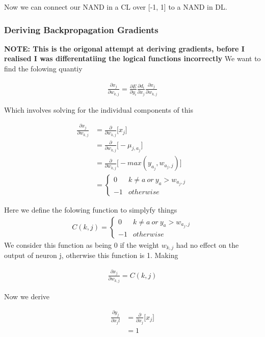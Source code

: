 \documentclass{article}
\begin{document}
Now we can connect our NAND in a CL over [-1, 1] to a NAND in DL. 

\subsubsection{Deriving Backpropagation Gradients}
\textbf{NOTE: This is the origonal attempt at deriving gradients, before I realised I was differentatiing the logical functions incorrectly}
We want to find the folowing quantiy

\begin{align}
\frac{\partial x_j}{\partial w_{k,j}} = \frac{\partial E}{\partial y_i} \frac{\partial d_i}{\partial x_j} \frac{\partial x_j}{\partial w_{k,j}}
\end{align}

Which involves solving for the individual components of this

\begin{align*}
\frac{\partial x_j}{\partial w_{k,j}} &= \frac{\partial}{\partial w_{k,j}} \bigg[ x_j \bigg] \\
&= \frac{\partial}{\partial w_{k,j}} \bigg[ -\mu_{j, a_j} \bigg] \\
&= \frac{\partial}{\partial w_{k,j}} \bigg[ -max(y_{a_j}, w_{a_j, j}) \bigg] \\
&= 
\begin{cases}
0 & k \neq a\ or\ y_a > w_{a_j, j} \\
-1 & otherwise
\end{cases} 
\end{align*}

Here we define the folowing function to simplyfy things
\begin{align*}
C(k, j) =  
\begin{cases}
0 & k \neq a\ or\ y_a > w_{a_j, j} \\
-1 & otherwise
\end{cases} 
\end{align*}
We consider this function as being 0 if the weight $w_{k, j}$ had no effect on the output of neuron j, otherwise this function is 1. Making 

\begin{align}
\frac{\partial x_j}{\partial w_{k, j}} = C(k, j)
\end{align}

Now we derive

\begin{align*}
\frac{\partial y_j}{\partial x_jl} &= \frac{\partial}{\partial x_j} \bigg[ x_j\bigg] \\
&= 1
\end{align*}
\end{document}
